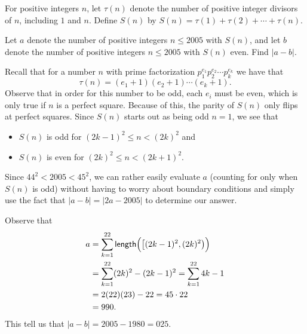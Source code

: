 \documentclass[a4paper, 12pt]{article}
\begin{document}
\setcounter{pnum}{11}

\begin{chirpbox}
    \begin{problemnum}
        For positive integers \( n \), let \( \tau (n) \) denote the number of positive integer divisors of \( n \), including \( 1 \) and \( n \). Define \( S(n) \) by \( S(n) = \tau(1) + \tau(2) + \cdots + \tau(n) \).
        
        \vspace{0.3cm}

        Let \( a \) denote the number of positive integers \( n \le 2005 \) with \( S(n) \), and let \( b \) denote the number of positive integers \( n \le 2005 \) with \( S(n) \) even. Find \( \lvert a - b \rvert \).
    \end{problemnum}
\end{chirpbox}

\begin{solution}
    Recall that for a number \( n \) with prime factorization \( p_1^{e_1} p_2^{e_2} \cdots p_k^{e_k} \) we have that
    \[
        \tau(n) = (e_1 + 1) (e_2 + 1) \cdots (e_k + 1)
    .\]
    Observe that in order for this number to be odd, each \( e_i \) must be even, which is only true if \( n \) is a perfect square. Because of this, the parity of \( S(n) \) only flips at perfect squares. Since \( S(n) \) starts out as being odd \( n = 1 \), we see that
    \begin{itemize}
        \item \( S(n) \) is odd for \( (2k - 1)^2 \le n < (2k)^2  \) and
        \item \( S(n) \) is even for \( (2k)^2 \le n < (2k + 1)^2 \).
    \end{itemize}
    Since \( 44^2 < 2005 < 45^2 \), we can rather easily evaluate \( a \) (counting for only when \( S(n) \) is odd) without having to worry about boundary conditions and simply use the fact that \( \lvert a - b \rvert = \lvert 2a - 2005 \rvert \) to determine our answer.

    Observe that
    \begin{align*}
        a &= \sum_{k = 1}^{22}  \textsf{length}\Bigl( \bigl[(2k - 1)^2, (2k)^2\bigr) \Bigr) \\
        &= \sum_{k = 1}^{22} (2k)^2 - (2k-1)^2 = \sum_{k = 1}^{22} 4k - 1 \\
        &= 2(22)(23) - 22 = 45 \cdot 22 \\
        &= 990
    .\end{align*}
    This tell us that \( \lvert a - b \rvert = 2005 - 1980 = \boxed{025} \).
\end{solution}
\end{document}
